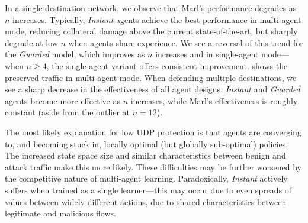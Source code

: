 \documentclass[10pt, times, conference, letterpaper]{IEEEtran}
\begin{document}
%	
%
%	
%
%	

In a single-destination network, we observe that Marl's performance degrades as $n$ increases.
Typically, \emph{Instant} agents achieve the best performance in multi-agent mode, reducing collateral damage above the current state-of-the-art, but sharply degrade at low $n$ when agents share experience.
We see a reversal of this trend for the \emph{Guarded} model, which improves as $n$ increases and in single-agent mode---when $n\ge4$, the single-agent variant offers consistent improvement.
 shows the preserved traffic in multi-agent mode.
When defending multiple destinations, we see a sharp decrease in the effectiveness of all agent designs.
\emph{Instant} and \emph{Guarded} agents become more effective as $n$ increases, while Marl's effectiveness is roughly constant (aside from the outlier at $n=12$).

The most likely explanation for low UDP protection is that agents are converging to, and becoming stuck in, locally optimal (but globally sub-optimal) policies.
The increased state space size and similar characteristics between benign and attack traffic make this more likely.
These difficulties may be further worsened by the competitive nature of multi-agent learning.
Paradoxically, \emph{Instant} actively suffers when trained as a single learner---this may occur due to even spreads of values between widely different actions, due to shared characteristics between legitimate and malicious flows.
\end{document}
